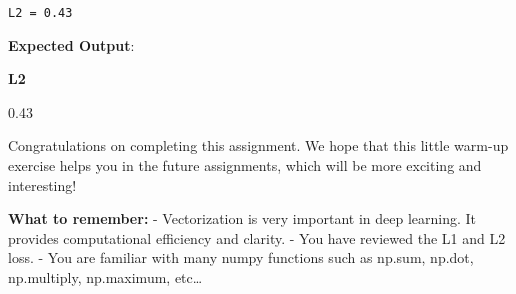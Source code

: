\documentclass[11pt]{article}
\begin{document}
    \begin{Verbatim}[commandchars=\\\{\}]
L2 = 0.43
    \end{Verbatim}

    \textbf{Expected Output}:

\textbf{L2}

0.43

    Congratulations on completing this assignment. We hope that this little
warm-up exercise helps you in the future assignments, which will be more
exciting and interesting!

     \textbf{What to remember:} - Vectorization is very important in deep
learning. It provides computational efficiency and clarity. - You have
reviewed the L1 and L2 loss. - You are familiar with many numpy
functions such as np.sum, np.dot, np.multiply, np.maximum, etc\ldots{}


    
    
    
\end{document}
